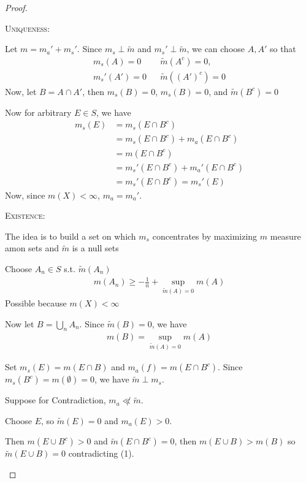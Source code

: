 \begin{proof} \phantom{.} \hfill
	\begin{steps}
	\item \textsc{Uniqueness:} \par
			Let $m = m_{a}' + m_{s}'$.
			Since $m_{s} \perp \tilde m$ and $m_{s}' \perp \tilde m$, we can choose
			$A , A'$ so that
      \begin{align*}
        m_s (A) = 0    && \tilde m (A^{c}) = 0, \\
        m_s' (A') = 0  && \tilde m ( (A')^c) = 0
			\end{align*}
			Now, let $B = A \cap A'$, then  $m_s (B) = 0$, $m_s (B) = 0$, and $\tilde m(B^c) = 0$

			Now for arbitrary $E \in S$, we have
			\begin{align*}
				m_s (E) &= m_s ( E \cap B^c) \\
						&= m_s (E \cap B^c) + m_a (E \cap B^c) \\
						&= m (E \cap B^c) \\
						&= m_s' (E \cap B^c) + m_a' (E \cap B^c) \\
						&= m_s' (E \cap B^c) = m_s'(E)
			\end{align*}
			Now, since $m (X) < \infty$, $m_a = m_a'$.
		\item \textsc{Existence:}

			The idea is to build a set on which $m_s$ concentrates by maximizing $m$ measure amon sets and $\tilde m$ is a null sets

			Choose $A_{n} \in S$ s.t. $ \tilde m (A_{n})$
			\begin{align*}
				m(A_{n}) \geq -\frac{1}{n} + \sup_{\tilde{m} (A) = 0} m(A)
			\end{align*} Possible because $m(X) < \infty$


			Now let  $B = \bigcup_{n} A_{n}$. Since $\tilde m (B) = 0$, we have
			\begin{align}
				m(B) = \sup_{\tilde m (A) = 0} m (A)
			\end{align}

			Set $m_s (E) = m (E \cap B)$ and $m_a (f) = m (E \cap B^c)$.
			Since  $m_s (B^c) = m( \emptyset) = 0$, we have $\tilde m \perp m_s$.


			Suppose for Contradiction, $m_a \not \ll \tilde m$.

			Choose $E$, so $\tilde m (E) = 0$ and $m_a (E) > 0$.

			Then $m(E \cup B^c) > 0$ and $\tilde m (E \cap B^c) = 0$, then
			$m(E \cup B) > m (B)$
			so  $\tilde m (E \cup B) = 0$ contradicting (1).
	\end{steps}
\end{proof}

